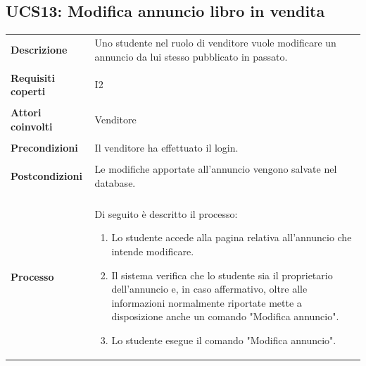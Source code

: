 \documentclass[10pt,a4paper]{report}
\begin{document}
	\subsection{UCS13: Modifica annuncio libro in vendita}
	\begin{tabular}{lp{}}
		\textbf{Descrizione}&Uno studente nel ruolo di venditore vuole modificare un annuncio da lui stesso pubblicato in passato.\\
		\\
		\textbf{Requisiti coperti}&I2\\
		\\
		\textbf{Attori coinvolti}&Venditore\\
		\\
		\textbf{Precondizioni}&Il venditore ha effettuato il login.\\
		\\
		\textbf{Postcondizioni}&Le modifiche apportate all'annuncio vengono salvate nel database.\\
		\\
		\textbf{Processo}&Di seguito è descritto il processo:
		\begin{enumerate}
			\item Lo studente accede alla pagina relativa all'annuncio che intende modificare.
			\item Il sistema verifica che lo studente sia il proprietario dell'annuncio e, in caso affermativo, oltre alle informazioni normalmente riportate mette a disposizione anche un comando "Modifica annuncio".
			\item Lo studente esegue il comando "Modifica annuncio".
			

\end{enumerate}
\end{tabular}
\end{document}
